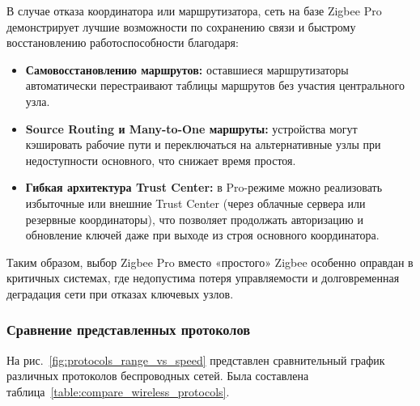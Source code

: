 \documentclass[14pt,a4paper]{extarticle}
\begin{document}
В случае отказа координатора или маршрутизатора, сеть на базе Zigbee Pro демонстрирует лучшие возможности по сохранению связи и быстрому восстановлению работоспособности \cite{Fault_Tolerance_ZigBee} благодаря:
\begin{itemize}
  \item \textbf{Самовосстановлению маршрутов:} оставшиеся маршрутизаторы автоматически перестраивают таблицы маршрутов без участия центрального узла.
  \item \textbf{Source Routing и Many-to-One маршруты:} устройства могут кэшировать рабочие пути и переключаться на альтернативные узлы при недоступности основного, что снижает время простоя.
  \item \textbf{Гибкая архитектура Trust Center:} в Pro-режиме можно реализовать избыточные или внешние Trust Center (через облачные сервера или резервные координаторы), что позволяет продолжать авторизацию и обновление ключей даже при выходе из строя основного координатора.
\end{itemize}

Таким образом, выбор Zigbee Pro вместо «простого» Zigbee особенно оправдан в критичных системах, где недопустима потеря управляемости и долговременная деградация сети при отказах ключевых узлов.  




\subsubsection{Сравнение представленных протоколов}
На рис.~\ref{fig:protocols_range_vs_speed} представлен сравнительный график различных протоколов беспроводных сетей. Была составлена таблица~\ref{table:compare_wireless_protocols}.
\end{document}
